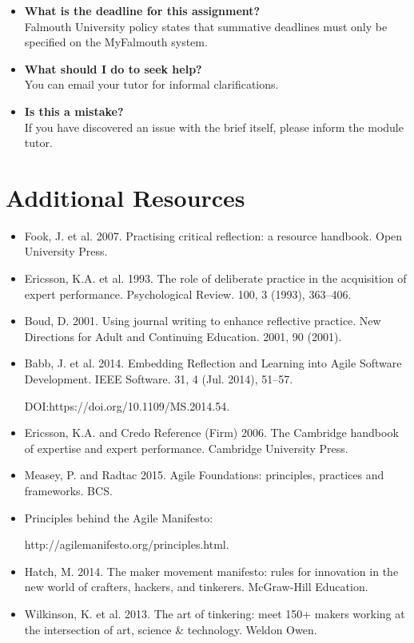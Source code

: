 \documentclass{../../fal_assignment}
\begin{document}
\begin{itemize}
	\item 	\textbf{What is the deadline for this assignment?} \\ 
    		Falmouth University policy states that summative deadlines must only be specified on the MyFalmouth system.
	\item 	\textbf{What should I do to seek help?} \\ 
    		You can email your tutor for informal clarifications.    		
    	\item 	\textbf{Is this a mistake?} \\ 	
    		If you have discovered an issue with the brief itself, please inform the module tutor.
\end{itemize}

\section*{Additional Resources}
\begin{itemize}
\item Fook, J. et al. 2007. Practising critical reflection: a resource handbook. Open University Press.
\item Ericsson, K.A. et al. 1993. The role of deliberate practice in the acquisition of expert performance. Psychological Review. 100, 3 (1993), 363–406.
\item Boud, D. 2001. Using journal writing to enhance reflective practice. New Directions for Adult and Continuing Education. 2001, 90 (2001).
\item Babb, J. et al. 2014. Embedding Reflection and Learning into Agile Software Development. IEEE Software. 31, 4 (Jul. 2014), 51–57.

DOI:https://doi.org/10.1109/MS.2014.54.
\item Ericsson, K.A. and Credo Reference (Firm) 2006. The Cambridge handbook of expertise and expert performance. Cambridge University Press.
\item Measey, P. and Radtac 2015. Agile Foundations: principles, practices and frameworks. BCS.
\item Principles behind the Agile Manifesto: 

http://agilemanifesto.org/principles.html.
\item Hatch, M. 2014. The maker movement manifesto: rules for innovation in 	the new world of crafters, hackers, and tinkerers. McGraw-Hill Education.
\item Wilkinson, K. et al. 2013. The art of tinkering: meet 150+ makers working at the intersection of art, science \& technology. Weldon Owen.
\end{itemize}
\end{document}
